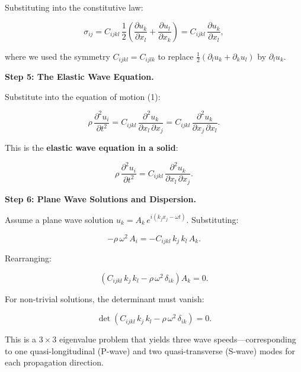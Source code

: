 Substituting into the constitutive law:

\begin{equation}
\sigma_{ij} = C_{ijkl}\,\frac{1}{2}\left(\frac{\partial u_k}{\partial x_l} + \frac{\partial u_l}{\partial x_k}\right) = C_{ijkl}\,\frac{\partial u_k}{\partial x_l},
\end{equation}

where we used the symmetry $C_{ijkl} = C_{ijlk}$ to replace $\frac{1}{2}(\partial_l u_k + \partial_k u_l)$ by $\partial_l u_k$.

\textbf{Step 5: The Elastic Wave Equation.}

Substitute into the equation of motion (1):

\begin{equation}
\rho\,\frac{\partial^2 u_i}{\partial t^2} = C_{ijkl}\,\frac{\partial^2 u_k}{\partial x_l\,\partial x_j} = C_{ijkl}\,\frac{\partial^2 u_k}{\partial x_j\,\partial x_l}.
\end{equation}

This is the \textbf{elastic wave equation in a solid}:

\begin{equation}
\boxed{\rho\,\frac{\partial^2 u_i}{\partial t^2} = C_{ijkl}\,\frac{\partial^2 u_k}{\partial x_l\,\partial x_j}.}
\end{equation}

\textbf{Step 6: Plane Wave Solutions and Dispersion.}

Assume a plane wave solution $u_k = A_k\,e^{i(k_j x_j - \omega t)}$. Substituting:

\begin{equation}
-\rho\,\omega^2\,A_i = -C_{ijkl}\,k_j\,k_l\,A_k.
\end{equation}

Rearranging:

\begin{equation}
\left(C_{ijkl}\,k_j\,k_l - \rho\,\omega^2\,\delta_{ik}\right)A_k = 0.
\end{equation}

For non-trivial solutions, the determinant must vanish:

\begin{equation}
\det\left(C_{ijkl}\,k_j\,k_l - \rho\,\omega^2\,\delta_{ik}\right) = 0.
\end{equation}

This is a $3 \times 3$ eigenvalue problem that yields three wave speeds---corresponding to one quasi-longitudinal (P-wave) and two quasi-transverse (S-wave) modes for each propagation direction.

